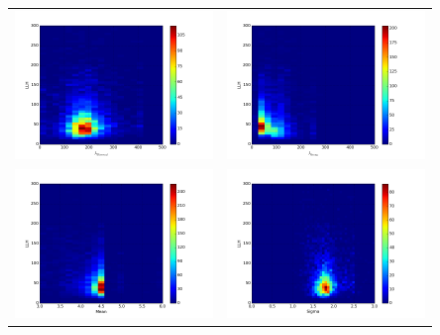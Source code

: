 \begin{figure}[h]
\centering
\begin{tabular}{cc}
  	 \includegraphics[width=0.5\linewidth]{llh_vs_thermal.png} &
	 \includegraphics[width=0.5\linewidth]{llh_vs_decay.png} \\
 	 
 	 \includegraphics[width=0.5\linewidth]{llh_vs_mean.png}  &
	 \includegraphics[width=0.5\linewidth]{llh_vs_sigma.png} \\


\end{tabular}
\end{figure}
